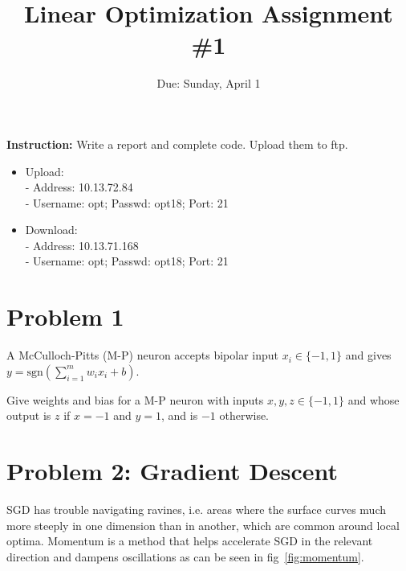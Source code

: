 \documentclass[12pt]{article}
\title{\textbf{Linear Optimization Assignment \#1}}
\author{Due: Sunday, April 1}
\date{}
\begin{document}
\maketitle

\textbf{\color{NavyBlue}Instruction:} Write a report and complete code. Upload them to ftp.
\begin{itemize}
	\item Upload:  \\
	      - Address: 10.13.72.84 \\
	      - Username: opt; Passwd:  opt18; Port: 21
	\item Download: \\
	      - Address: 10.13.71.168 \\
	      - Username: opt; Passwd:  opt18; Port: 21
\end{itemize}



\section{Problem 1}

A McCulloch-Pitts (M-P) neuron accepts bipolar input $x_i \in \{-1,1\}$ and gives  $y=\mathrm{sgn} (\sum_{i=1}^{m} w_ix_i + b) $.

Give weights and bias for a M-P neuron with inputs
$x,y,z \in \{-1,1\}$ and whose output is  $z$ if $x = -1$ and $y = 1$, and is $-1$ otherwise.




\section{Problem 2: Gradient Descent} 
SGD has trouble navigating ravines, i.e. areas where the surface curves much more steeply in one dimension than in another, which are common around local optima. Momentum is a method that helps accelerate SGD in the relevant direction and dampens oscillations as can be seen in fig~\ref{fig:momentum}. 
\end{document}
